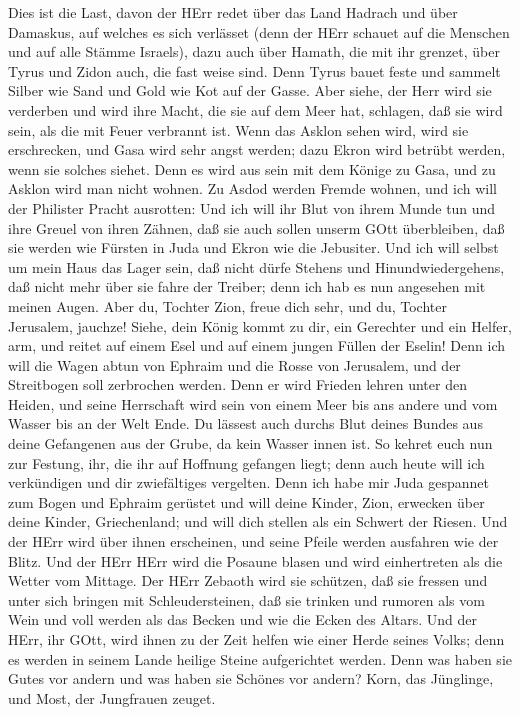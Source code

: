  Dies ist die Last, davon der HErr redet über das Land
Hadrach und über Damaskus, auf welches es sich verlässet (denn der HErr
schauet auf die Menschen und auf alle Stämme Israels),  dazu
auch über Hamath, die mit ihr grenzet, über Tyrus und Zidon auch, die
fast weise sind.  Denn Tyrus bauet feste und sammelt Silber
wie Sand und Gold wie Kot auf der Gasse.  Aber siehe, der
Herr wird sie verderben und wird ihre Macht, die sie auf dem Meer hat,
schlagen, daß sie wird sein, als die mit Feuer verbrannt ist.
 Wenn das Asklon sehen wird, wird sie erschrecken, und Gasa
wird sehr angst werden; dazu Ekron wird betrübt werden, wenn sie solches
siehet. Denn es wird aus sein mit dem Könige zu Gasa, und zu Asklon wird
man nicht wohnen.  Zu Asdod werden Fremde wohnen, und ich
will der Philister Pracht ausrotten:  Und ich will ihr Blut
von ihrem Munde tun und ihre Greuel von ihren Zähnen, daß sie auch
sollen unserm GOtt überbleiben, daß sie werden wie Fürsten in Juda und
Ekron wie die Jebusiter.  Und ich will selbst um mein Haus
das Lager sein, daß nicht dürfe Stehens und Hinundwiedergehens, daß
nicht mehr über sie fahre der Treiber; denn ich hab es nun angesehen mit
meinen Augen.  Aber du, Tochter Zion, freue dich sehr, und
du, Tochter Jerusalem, jauchze! Siehe, dein König kommt zu dir, ein
Gerechter und ein Helfer, arm, und reitet auf einem Esel und auf einem
jungen Füllen der Eselin!  Denn ich will die Wagen abtun
von Ephraim und die Rosse von Jerusalem, und der Streitbogen soll
zerbrochen werden. Denn er wird Frieden lehren unter den Heiden, und
seine Herrschaft wird sein von einem Meer bis ans andere und vom Wasser
bis an der Welt Ende.  Du lässest auch durchs Blut deines
Bundes aus deine Gefangenen aus der Grube, da kein Wasser innen ist.
 So kehret euch nun zur Festung, ihr, die ihr auf Hoffnung
gefangen liegt; denn auch heute will ich verkündigen und dir
zwiefältiges vergelten.  Denn ich habe mir Juda gespannet
zum Bogen und Ephraim gerüstet und will deine Kinder, Zion, erwecken
über deine Kinder, Griechenland; und will dich stellen als ein Schwert
der Riesen.  Und der HErr wird über ihnen erscheinen, und
seine Pfeile werden ausfahren wie der Blitz. Und der HErr HErr wird die
Posaune blasen und wird einhertreten als die Wetter vom Mittage.
 Der HErr Zebaoth wird sie schützen, daß sie fressen und
unter sich bringen mit Schleudersteinen, daß sie trinken und rumoren als
vom Wein und voll werden als das Becken und wie die Ecken des Altars.
 Und der HErr, ihr GOtt, wird ihnen zu der Zeit helfen wie
einer Herde seines Volks; denn es werden in seinem Lande heilige Steine
aufgerichtet werden.  Denn was haben sie Gutes vor andern
und was haben sie Schönes vor andern? Korn, das Jünglinge, und Most, der
Jungfrauen zeuget.

